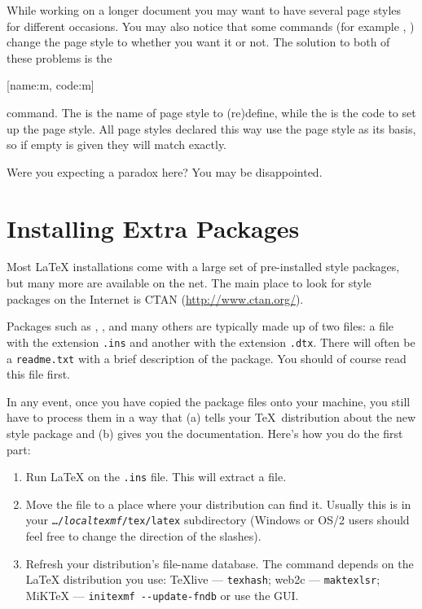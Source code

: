 While working on a longer document you may want to have several page styles for
different occasions. You may also notice that some commands (for example
, ) change the page style to  whether
you want it or not. The solution to both of these problems is the
\begin{lscommand}
  [name:m, code:m]
\end{lscommand}
command. The  is the name of page style to (re)define, while the %
 is the code to set up the page style. All page styles declared this
way use the  page style as its basis, so if empty  is
given they will match  exactly.
\begin{example}[standalone, paperheight=3cm]
\geometry{includehead, includefoot, headsep=.5em, footskip=1em} %
\sloppy %
\usepackage{fancyhdr}%
\usepackage{extramarks}%
\pagestyle{mine}

Were you expecting a paradox here?
\noindent
You may be disappointed.

\end{example}

\section{Installing Extra Packages}\label{sec:Packages}

Most \LaTeX{} installations come with a large set of pre-installed
style packages, but many more are available on the net. The main
place to look for style packages on the Internet is CTAN (\url{http://www.ctan.org/}).

Packages such as , , and many
others are typically made up of two files: a file with the extension
\texttt{.ins} and another with the extension \texttt{.dtx}. There
will often be a \texttt{readme.txt} with a brief description of the
package. You should of course read this file first.

In any event, once you have copied the package files onto your
machine, you still have to process them in a way that (a) tells your
\TeX\ distribution about the new style package and (b) gives you
the documentation.  Here's how you do the first part:

\begin{enumerate}
  \item Run \LaTeX{} on the \texttt{.ins} file. This will
        extract a  file.
  \item Move the  file to a place where your distribution
        can find it. Usually this is in your \texttt{\ldots/\emph{localtexmf}/tex/latex}
        subdirectory (Windows or OS/2 users should feel free to change the
        direction of the slashes).
  \item Refresh your distribution's file-name database. The command
        depends on the \LaTeX{} distribution you use:
        \TeX{}live --- \texttt{texhash}; web2c --- \texttt{maktexlsr};
        MiK\TeX{} --- \texttt{initexmf -{}-update-fndb} or use the GUI\@.
\end{enumerate}

